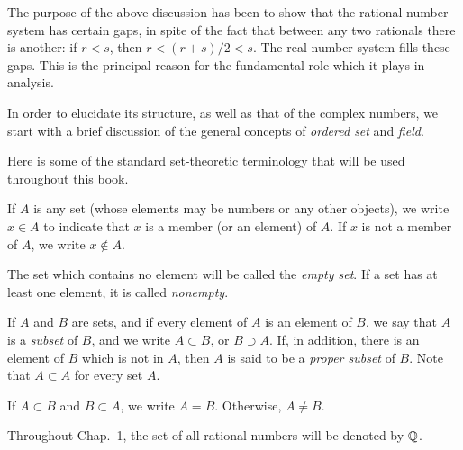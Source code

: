 The purpose of the above discussion has been to show that the rational number
system has certain gaps, in spite of the fact that between any two rationals
there is another: if $r < s$, then $r < (r+s)/2 < s$. The
real number system fills these gaps. This is the principal reason for the
fundamental role which it plays in analysis.

In order to elucidate its structure, as well as that of the complex numbers, we
start with a brief discussion of the general concepts of \emph{ordered set} and
\emph{field}.

Here is some of the standard set-theoretic terminology that will be used
throughout this book.

If $A$ is any set (whose elements may be numbers or any other objects), we write
$x \in A$ to indicate that $x$ is a member (or an element) of $A$. If $x$ is not
a member of $A$, we write $x \notin A$.

The set which contains no element will be called the \emph{empty set}. If a set
has at least one element, it is called \emph{nonempty}.

If $A$ and $B$ are sets, and if every element of $A$ is an element of $B$, we
say that $A$ is a \emph{subset} of $B$, and we write $A \subset B$, or
$B \supset A$. If, in addition, there is an element
of $B$ which is not in $A$, then $A$ is said to be a \emph{proper subset} of
$B$. Note that $A \subset A$ for every set $A$.

If $A \subset B$ and $B \subset A$, we write $A = B$. Otherwise, $A \ne B$.

Throughout Chap.\ 1, the set of all rational numbers will be denoted by $\mathbb{Q}$.
